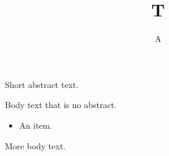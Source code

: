 \documentclass{article}
\begin{document}
\title{T}\author{A}\maketitle
\abstract
Short abstract text.

 Body text that is no abstract.

\begin{itemize}\item An item.\end{itemize}
More body text.
\end{document}
